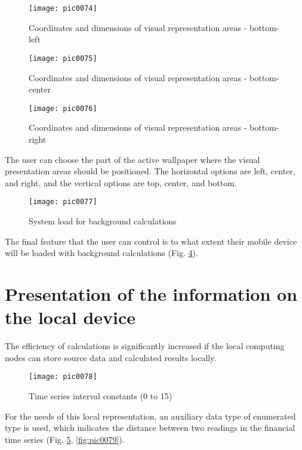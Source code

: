 \begin{figure}[h]
\centering
\texttt{[image: pic0074]}
\caption{Coordinates and dimensions of visual representation areas - bottom-left}
\label{fig:pic0074}
\end{figure}
\FloatBarrier

\begin{figure}[h]
\centering
\texttt{[image: pic0075]}
\caption{Coordinates and dimensions of visual representation areas - bottom-center}
\label{fig:pic0075}
\end{figure}
\FloatBarrier

\begin{figure}[h]
\centering
\texttt{[image: pic0076]}
\caption{Coordinates and dimensions of visual representation areas - bottom-right}
\label{fig:pic0076}
\end{figure}
\FloatBarrier

The user can choose the part of the active wallpaper where the visual presentation areas should be positioned. The horizontal options are left, center, and right, and the vertical options are top, center, and bottom.

\begin{figure}[h]
\centering
\texttt{[image: pic0077]}
\caption{System load for background calculations}
\label{fig:pic0077}
\end{figure}
\FloatBarrier

The final feature that the user can control is to what extent their mobile device will be loaded with background calculations (Fig. \ref{fig:pic0077}).

\section{Presentation of the information on the local device}

The efficiency of calculations is significantly increased if the local computing nodes can store source data and calculated results locally.

\begin{figure}[h]
\centering
\texttt{[image: pic0078]}
\caption{Time series interval constants (0 to 15)}
\label{fig:pic0078}
\end{figure}
\FloatBarrier

For the needs of this local representation, an auxiliary data type of enumerated type is used, which indicates the distance between two readings in the financial time series (Fig. \ref{fig:pic0078}, \ref{fig:pic0079}).

